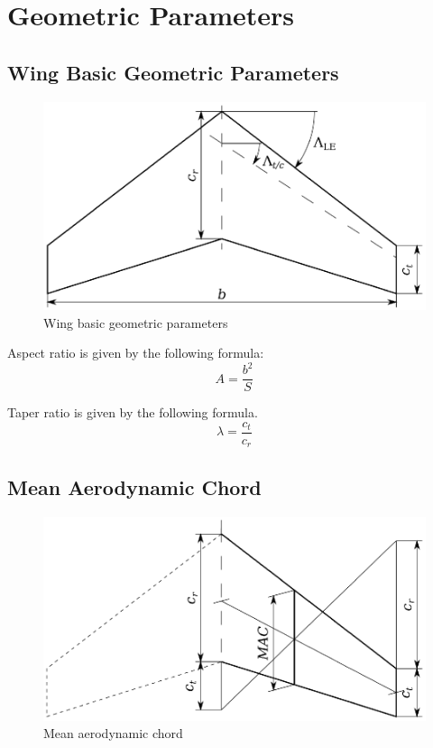 \chapter{Geometric Parameters}

\section{Wing Basic Geometric Parameters}

\begin{figure}
  \centering
  \includegraphics[width=120mm]{eps/wing_geometric_parameters.eps}
  \caption{Wing basic geometric parameters}
\end{figure}

Aspect ratio is given by the following formula: \cite{Raymer1992}
\begin{equation}
  A = \frac{b^2}{S}
\end{equation}

Taper ratio is given by the following formula. \cite{Raymer1992}
\begin{equation}
  \lambda = \frac{c_t}{c_r}
\end{equation}

\section{Mean Aerodynamic Chord}

\begin{figure}
  \centering
  \includegraphics[width=120mm]{eps/wing_mean_aerodynamic_chord.eps}
  \caption{Mean aerodynamic chord}
\end{figure}

